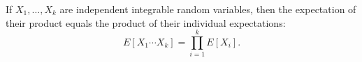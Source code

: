 If $X_1, \ldots, X_k$ are independent integrable random variables, then the expectation of their product equals the product of their individual expectations:
$$E[X_1 \cdots X_k] = \prod_{i=1}^{k} E[X_i].$$
